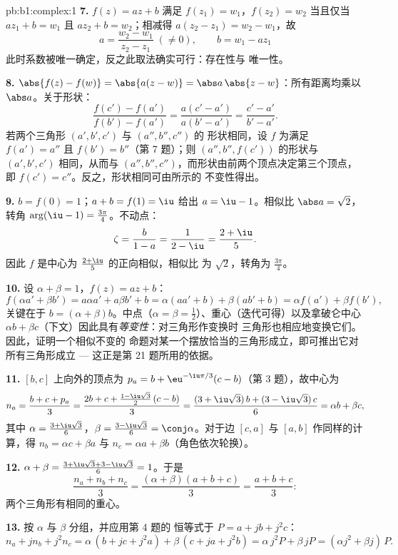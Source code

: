 \begin{solution}{pb:b1:complex:1}
\textbf{7.} $f(z) = az + b$ 满足 $f(z_1) = w_1$，$f(z_2) =
w_2$ 当且仅当 $a z_1 + b = w_1$ 且 $a z_2 + b = w_2$；相减得
$a(z_2 - z_1) = w_2 - w_1$，故
\[
a = \frac{w_2 - w_1}{z_2 - z_1} \;(\neq 0), \qquad
b = w_1 - a z_1
\]
此时系数被唯一确定，反之此取法确实可行：存在性与
唯一性。

\textbf{8.} $\abs{f(z) - f(w)} = \abs{a(z - w)} = \abs a\,\abs{z -
w}$：所有距离均乘以 $\abs a$。关于形状：
\[
\frac{f(c') - f(a')}{f(b') - f(a')} = \frac{a(c' -
a')}{a(b' - a')} = \frac{c' - a'}{b' - a'} .
\]
若两个三角形 $(a', b', c')$ 与 $(a'', b'', c'')$ 的
形状相同，设 $f$ 为满足 $f(a') = a''$
且 $f(b') = b''$（第 7 题）；则 $(a'', b'',
f(c'))$ 的形状与 $(a', b', c')$ 相同，从而与 $(a'', b'',
c'')$，而形状由前两个顶点决定第三个顶点，
即 $f(c') = c''$。反之，形状相同可由所示的
不变性得出。

\textbf{9.} $b = f(0) = 1$；$a + b = f(1) = \iu$ 给出 $a = \iu -
1$。相似比 $\abs a = \sqrt2$，转角 $\arg(\iu - 1) =
\frac{3\pi}4$。不动点：
\[
\zeta = \frac{b}{1 - a} = \frac1{2 - \iu} = \frac{2 + \iu}5 .
\]
因此 $f$ 是中心为 $\frac{2+\iu}5$ 的正向相似，相似比
为 $\sqrt2$，转角为 $\frac{3\pi}4$。

\textbf{10.} 设 $\alpha + \beta = 1$，$f(z) = az + b$：
\[
f(\alpha a' + \beta b') = a\alpha a' + a\beta b' + b
= \alpha(a a' + b) + \beta(a b' + b)
= \alpha f(a') + \beta f(b') ,
\]
关键在于 $b = (\alpha + \beta)b$。中点（$\alpha = \beta =
\frac12$）、重心（迭代可得）以及拿破仑中心 $\alpha b
+ \beta c$（下文）因此具有\emph{等变性}：对三角形作变换时
三角形也相应地变换它们。因此，证明一个相似不变的
命题对某一个摆放恰当的三角形成立，即可推出它对所有三角形成立
--- 这正是第 21 题所用的依据。

\textbf{11.} $[b, c]$ 上向外的顶点为 $p_a = b +
\eu^{-\iu\pi/3}(c - b)$（第 3 题），故中心为
\[
n_a = \frac{b + c + p_a}3
= \frac{2b + c + \frac{1 - \iu\sqrt3}2\,(c - b)}3
= \frac{(3 + \iu\sqrt3)\,b + (3 - \iu\sqrt3)\,c}6
= \alpha b + \beta c ,
\]
其中 $\alpha = \frac{3 + \iu\sqrt3}6$，$\beta = \frac{3 -
\iu\sqrt3}6 = \conj\alpha$。对于边
$[c, a]$ 与 $[a, b]$ 作同样的计算，得 $n_b = \alpha c + \beta a$ 与 $n_c =
\alpha a + \beta b$（角色依次轮换）。

\textbf{12.} $\alpha + \beta = \frac{3 + \iu\sqrt3 + 3 -
\iu\sqrt3}6 = 1$。于是
\[
\frac{n_a + n_b + n_c}3
= \frac{(\alpha + \beta)(a + b + c)}3 = \frac{a + b + c}3 :
\]
两个三角形有相同的重心。

\textbf{13.} 按 $\alpha$ 与 $\beta$ 分组，并应用第 4 题的
恒等式于 $P = a + jb + j^2c$：
\[
n_a + j n_b + j^2 n_c
= \alpha\,(b + jc + j^2 a) + \beta\,(c + ja + j^2 b)
= \alpha\,j^2 P + \beta\,j P
= (\alpha j^2 + \beta j)\,P .
\]


\end{solution}
